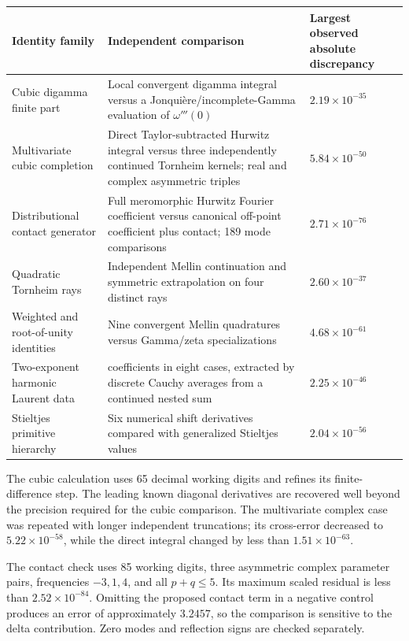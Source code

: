 \documentclass[11pt,a4paper]{article}
\theoremstyle{definition}
\theoremstyle{remark}
\numberwithin{equation}{section}
\begin{document}
\begin{longtable}{@{}>{\raggedright\arraybackslash}p{}
 >{\raggedright\arraybackslash}p{}
 >{\raggedright\arraybackslash}p{}@{}}
\toprule
Identity family & Independent comparison & Largest observed
absolute discrepancy\\
\midrule
\endhead
Cubic digamma finite part &
Local convergent digamma integral versus a
Jonqui\`ere/incomplete-Gamma evaluation of $\omega'''(0)$ &
$2.19\times10^{-35}$\\[3pt]
Multivariate cubic completion &
Direct Taylor-subtracted Hurwitz integral versus three independently
continued Tornheim kernels; real and complex asymmetric triples &
$5.84\times10^{-50}$\\[3pt]
Distributional contact generator &
Full meromorphic Hurwitz Fourier coefficient versus canonical
off-point coefficient plus contact; 189 mode comparisons &
$2.71\times10^{-76}$\\[3pt]
Quadratic Tornheim rays &
Independent Mellin continuation and symmetric extrapolation on
four distinct rays &
$2.60\times10^{-37}$\\[3pt]
Weighted and root-of-unity identities &
Nine convergent Mellin quadratures versus Gamma/zeta
specializations &
$4.68\times10^{-61}$\\[3pt]
Two-exponent harmonic Laurent data &
21 coefficients in eight cases, extracted by discrete Cauchy
averages from a continued nested sum &
$2.25\times10^{-46}$\\[3pt]
Stieltjes primitive hierarchy &
Six numerical shift derivatives compared with generalized
Stieltjes values &
$2.04\times10^{-56}$\\
\bottomrule
\end{longtable}

The cubic calculation uses 65 decimal working digits and refines
its finite-difference step. The leading known diagonal derivatives
are recovered well beyond the precision required for the cubic
comparison. The multivariate complex case was repeated with longer
independent truncations; its cross-error decreased to
$5.22\times10^{-58}$, while the direct integral changed by less
than $1.51\times10^{-63}$.

The contact check uses 85 working digits, three asymmetric complex
parameter pairs, frequencies $-3,1,4$, and all $p+q\le5$.
Its maximum scaled residual is less than
$2.52\times10^{-84}$. Omitting the proposed contact term in a
negative control produces an error of approximately $3.2457$,
so the comparison is sensitive to the delta contribution.
Zero modes and reflection signs are checked separately.
\end{document}
